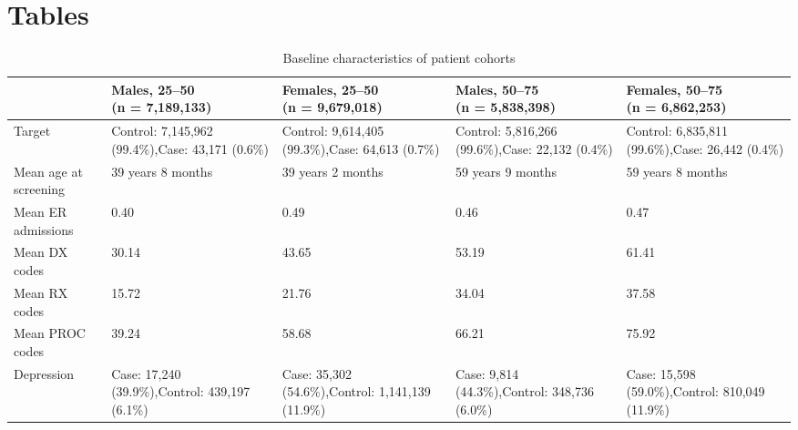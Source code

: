 \documentclass[12pt]{article}
\begin{document}
\section*{Tables}

\begin{table}[!ht]
\centering
\fontsize{9}{10}\selectfont

\caption{Baseline characteristics of patient cohorts}
\label{table_pat_char}

\begin{tabular}{
  |L{0.81in}|L{1.41in}|L{1.41in}|L{1.41in}|L{1.41in}|
}
\hline

\textbf{} &
\textbf{Males, 25--50\newline (n = 7,189,133)} &
\textbf{Females, 25--50\newline (n = 9,679,018)} &
\textbf{Males, 50--75\newline (n = 5,838,398)} &
\textbf{Females, 50--75\newline (n = 6,862,253)} \\
\hline

Target &
Control: 7,145,962 (99.4\%),\newline Case: 43,171 (0.6\%) &
Control: 9,614,405 (99.3\%),\newline Case: 64,613 (0.7\%) &
Control: 5,816,266 (99.6\%),\newline Case: 22,132 (0.4\%) &
Control: 6,835,811 (99.6\%),\newline Case: 26,442 (0.4\%) \\
\hline

Mean age at screening &
39 years 8 months &
39 years 2 months &
59 years 9 months &
59 years 8 months \\
\hline

Mean ER admissions & 0.40 & 0.49 & 0.46 & 0.47 \\
\hline
Mean DX codes & 30.14 & 43.65 & 53.19 & 61.41 \\
\hline
Mean RX codes & 15.72 & 21.76 & 34.04 & 37.58 \\
\hline
Mean PROC codes & 39.24 & 58.68 & 66.21 & 75.92 \\
\hline

Depression &
Case: 17,240 (39.9\%),\newline Control: 439,197 (6.1\%) &
Case: 35,302 (54.6\%),\newline Control: 1,141,139 (11.9\%) &
Case: 9,814 (44.3\%),\newline Control: 348,736 (6.0\%) &
Case: 15,598 (59.0\%),\newline Control: 810,049 (11.9\%) \\
\hline


\end{tabular}
\end{table}
\end{document}

